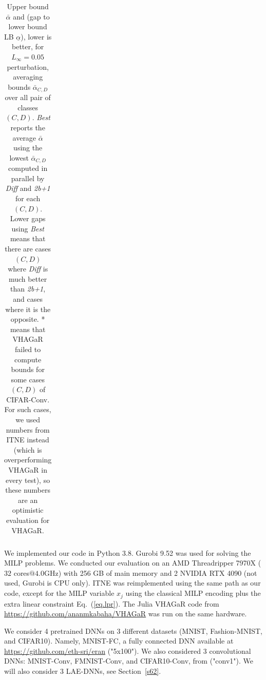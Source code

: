 \begin{table}[b!]
\begin{tabular}{||c c||c c c c c ||c|}
     \end{tabular}
	\caption{Upper bound $\bar{\alpha}$ and (gap to lower bound LB $\underline{\alpha}$), lower is better, for $L_\infty=0.05$ perturbation, averaging bounds $\bar{\alpha}_{C,D}$ over all pair of classes $(C,D)$. {\em Best} reports the average $\bar{\alpha}$ using the lowest $\bar{\alpha}_{C,D}$ computed 
	in parallel by {\em Diff} and {\em 2b+1} for each $(C,D)$. Lower gaps using {\em Best} means that there are cases $(C,D)$ where {\em Diff} is much better than {\em 2b+1}, and cases where it is the opposite. * means that VHAGaR failed to compute bounds for some cases $(C,D)$ of CIFAR-Conv. 
	For such cases, we used numbers from ITNE instead (which is overperforming VHAGaR in every test), so these numbers are an optimistic evaluation for VHAGaR.}
	\vspace{-0.4cm}
    \label{table.classical}
\end{table}


\label{sec.exp}

	We implemented our code in Python 3.8.
	Gurobi 9.52 was used for solving the MILP problems. We conducted our evaluation on an AMD Threadripper 7970X ($32$ cores$@4.0$GHz) with 256 GB of main memory and 2 NVIDIA RTX 4090 (not used, Gurobi is CPU only). 
	ITNE \cite{ITNE} was reimplemented using the same path as our code, except for the MILP variable $x_j$ using the classical MILP encoding plus the extra linear constraint Eq.~(\ref{eq.lpr}). The Julia VHAGaR code 
	from \url{https://github.com/ananmkabaha/VHAGaR} was run on the same hardware.
	
	We consider 4 pretrained DNNs on 3 different datasets (MNIST, Fashion-MNIST, and CIFAR10). Namely,  MNIST-FC, a fully connected DNN available at 
	\url{https://github.com/eth-sri/eran} ("5x100"). We also considered 3 convolutional DNNs: MNIST-Conv, FMNIST-Conv, and CIFAR10-Conv, 
	from \cite{vhagar} ("conv1"). We will also consider 3 LAE-DNNs, see Section~\ref{s62}.

